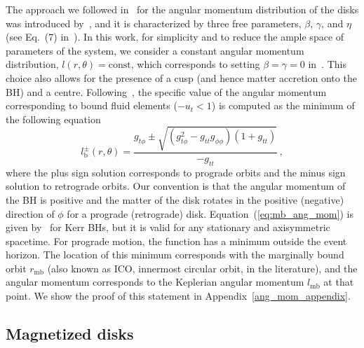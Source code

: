 \documentclass[twocolumn,aps,showpacs,showkeys,prd,superscriptaddress,byrevtex, amsmath]{revtex4-1}
\begin{document}
The approach we followed in~\cite{Gimeno-Soler:2017} for the angular momentum distribution of the disks was introduced by~\cite{Qian:2009}, and it is characterized by three free parameters, $\beta$, $\gamma$, and $\eta$ (see Eq.~(7) in~\cite{Gimeno-Soler:2017}). In this work, for simplicity and to reduce the ample space of parameters of the system, we consider a constant angular momentum distribution, $l(r,\theta) = \mathrm{const}$, which corresponds to setting $\beta=\gamma=0$ in~\cite{Gimeno-Soler:2017}. This choice also allows for the presence of a cusp (and hence matter accretion onto the BH) and a centre. Following~\citep{Daigne:2004}, the specific value of the angular momentum corresponding to bound fluid elements ($-u_t<1$) is computed as the minimum of the following equation
\begin{equation}\label{eq:mb_ang_mom}
l^{\pm}_{\mathrm{b}}(r, \theta) = \frac{g_{t\phi} \pm \sqrt{ (g_{t\phi}^2-g_{tt}g_{\phi\phi})  (1+g_{tt}) } }{-g_{tt}}\,,
\end{equation}
where the plus sign solution corresponds to prograde orbits and the minus sign solution to retrograde orbits. Our convention is that the angular momentum of the BH is positive and the matter of the disk rotates in the positive (negative) direction of $\phi$ for a prograde (retrograde) disk. Equation~(\ref{eq:mb_ang_mom}) is given by~\citep{Daigne:2004} for Kerr BHs, but it is valid for any stationary and axisymmetric spacetime. For prograde motion, the function has a minimum outside the event horizon. The location of this minimum corresponds with the marginally bound orbit $r_{\mathrm{mb}}$ (also known as ICO, innermost circular orbit, in the literature), and the angular momentum corresponds to the Keplerian angular momentum $l_{\mathrm{mb}}$ at that point. We show the proof of this statement in Appendix~\ref{ang_mom_appendix}.

\subsection{Magnetized disks}
\end{document}
